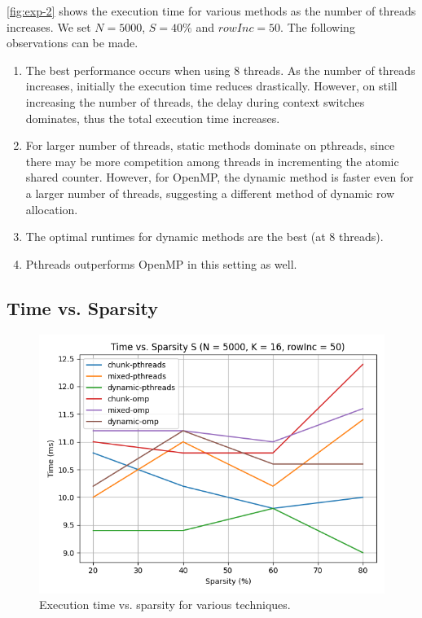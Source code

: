 \documentclass[conference,compsoc]{IEEEtran}
\begin{document}
\autoref{fig:exp-2} shows the execution time for various methods as the number
of threads increases. We set \(N = 5000\), \(S = 40\%\) and \(rowInc = 50\). The
following observations can be made.

\begin{enumerate}
    \item The best performance occurs when using 8 threads. As the number of
    threads increases, initially the execution time reduces drastically.
    However, on still increasing the number of threads, the delay during context
    switches dominates, thus the total execution time increases.
    \item For larger number of threads, static methods dominate on pthreads,
    since there may be more competition among threads in incrementing the atomic
    shared counter. However, for OpenMP, the dynamic method is faster even for a
    larger number of threads, suggesting a different method of dynamic row
    allocation.
    \item The optimal runtimes for dynamic methods are the best (at 8 threads).
    \item Pthreads outperforms OpenMP in this setting as well.
\end{enumerate}

\subsection{Time vs. Sparsity}
\label{subsec:exp3}

\begin{figure}[!ht]
    \includegraphics[width=\columnwidth]{images/exp3.png}
    \caption{Execution time vs. sparsity for various techniques.}
    \label{fig:exp-3}
\end{figure}
\end{document}
